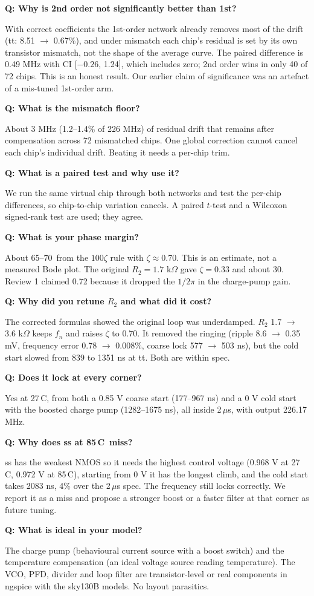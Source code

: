 \documentclass[11pt,a4paper]{article}
\newcommand{\qa}[2]{\par\smallskip\noindent\textbf{Q: #1}\par\noindent\hspace*{1em}\begin{minipage}[t]{\dimexpr\linewidth-1em}#2\end{minipage}\par}
\newcommand{\degC}{\textdegree C}
\begin{document}
\qa{Why is 2nd order not significantly better than 1st?}{With correct coefficients the 1st-order network already removes most of the drift (tt: 8.51 $\to$ 0.67\%), and under mismatch each chip's residual is set by its own transistor mismatch, not the shape of the average curve. The paired difference is 0.49 MHz with CI [$-0.26$, 1.24], which includes zero; 2nd order wins in only 40 of 72 chips. This is an honest result. Our earlier claim of significance was an artefact of a mis-tuned 1st-order arm.}

\qa{What is the mismatch floor?}{About 3 MHz (1.2--1.4\% of 226 MHz) of residual drift that remains after compensation across 72 mismatched chips. One global correction cannot cancel each chip's individual drift. Beating it needs a per-chip trim.}

\qa{What is a paired test and why use it?}{We run the same virtual chip through both networks and test the per-chip differences, so chip-to-chip variation cancels. A paired $t$-test and a Wilcoxon signed-rank test are used; they agree.}

\qa{What is your phase margin?}{About 65--70\degree\ from the $100\zeta$ rule with $\zeta\approx0.70$. This is an estimate, not a measured Bode plot. The original $R_2=1.7$ k$\Omega$ gave $\zeta=0.33$ and about 30\degree. Review 1 claimed 0.72 because it dropped the $1/2\pi$ in the charge-pump gain.}

\qa{Why did you retune $R_2$ and what did it cost?}{The corrected formulas showed the original loop was underdamped. $R_2$ 1.7 $\to$ 3.6 k$\Omega$ keeps $f_n$ and raises $\zeta$ to 0.70. It removed the ringing (ripple 8.6 $\to$ 0.35 mV, frequency error 0.78 $\to$ 0.008\%, coarse lock 577 $\to$ 503 ns), but the cold start slowed from 839 to 1351 ns at tt. Both are within spec.}

\qa{Does it lock at every corner?}{Yes at 27\,\degC, from both a 0.85 V coarse start (177--967 ns) and a 0 V cold start with the boosted charge pump (1282--1675 ns), all inside 2\,$\mu$s, with output 226.17 MHz.}

\qa{Why does ss at 85\,\degC\ miss?}{ss has the weakest NMOS so it needs the highest control voltage (0.968 V at 27\,\degC, 0.972 V at 85\,\degC), starting from 0 V it has the longest climb, and the cold start takes 2083 ns, 4\% over the 2\,$\mu$s spec. The frequency still locks correctly. We report it as a miss and propose a stronger boost or a faster filter at that corner as future tuning.}

\qa{What is ideal in your model?}{The charge pump (behavioural current source with a boost switch) and the temperature compensation (an ideal voltage source reading temperature). The VCO, PFD, divider and loop filter are transistor-level or real components in ngspice with the sky130B models. No layout parasitics.}
\end{document}
